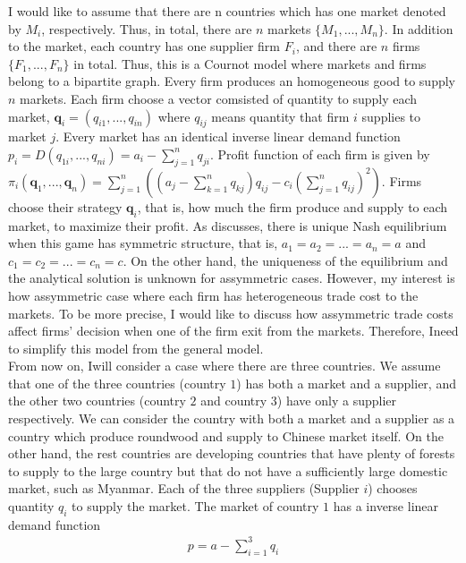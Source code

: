 \documentclass[a4paper,12pt]{article}
\begin{document}
I would like to assume that there are n countries which has one market denoted by $M_i$, respectively. Thus, in total, there are $n$ markets $\{ M_1, ..., M_n \}$. In addition to the market, each country has one supplier firm $F_i$, and there are $n$ firms $\{ F_1, ..., F_n \}$ in total. Thus, this is a Cournot model where markets and firms belong to a bipartite graph. Every firm produces an homogeneous good to supply $n$ markets. Each firm choose a vector comsisted of quantity to supply each market, $\mathbf{q}_i = (q_{i1}, ..., q_{in})$ where $q_{ij}$ means quantity that firm $i$ supplies to market $j$. Every market has an identical inverse linear demand function $p_i = D(q_{1i}, ..., q_{ni}) = a_i - \sum_{j=1}^n q_{ji}$. Profit function of each firm is given by $\pi_i (\mathbf{q}_1, ..., \mathbf{q}_n) = \sum_{j = 1}^{n} ((a_j - \sum_{k=1}^n q_{kj}) q_{ij} - c_{i} (\sum_{j = 1}^{n} q_{ij} ) ^ 2 )$. Firms choose their strategy $\mathbf{q}_i$, that is, how much the firm produce and supply to each market, to maximize their profit. As \cite{bimpikis2019cournot} discusses, there is unique Nash equilibrium when this game has symmetric structure, that is, $a_1 = a_2 = ... = a_n = a$ and $c_1 = c_2 = ... = c_n = c$. On the other hand, the uniqueness of the equilibrium and the analytical solution is unknown for assymmetric cases. However, my interest is how assymmetric case where each firm has heterogeneous trade cost to the markets. To be more precise, I would like to discuss how assymmetric trade costs affect firms' decision when one of the firm exit from the markets. Therefore, Ineed to simplify this model from the general model. \\

From now on, Iwill consider a case where there are three countries. We assume that one of the three countries (country $1$) has both a market and a supplier, and the other two countries (country $2$ and country $3$) have only a supplier respectively. We can consider the country with both a market and a supplier as a country which produce roundwood and supply to Chinese market itself. On the other hand, the rest countries are developing countries that have plenty of forests to supply to the large country but that do not have a sufficiently large domestic market, such as Myanmar. Each of the three suppliers (Supplier $i$) chooses quantity $q_i$ to supply the market. The market of country $1$ has a inverse linear demand function
\begin{align}
    p = a - \sum_{i=1}^3 q_i
\end{align}
\end{document}
